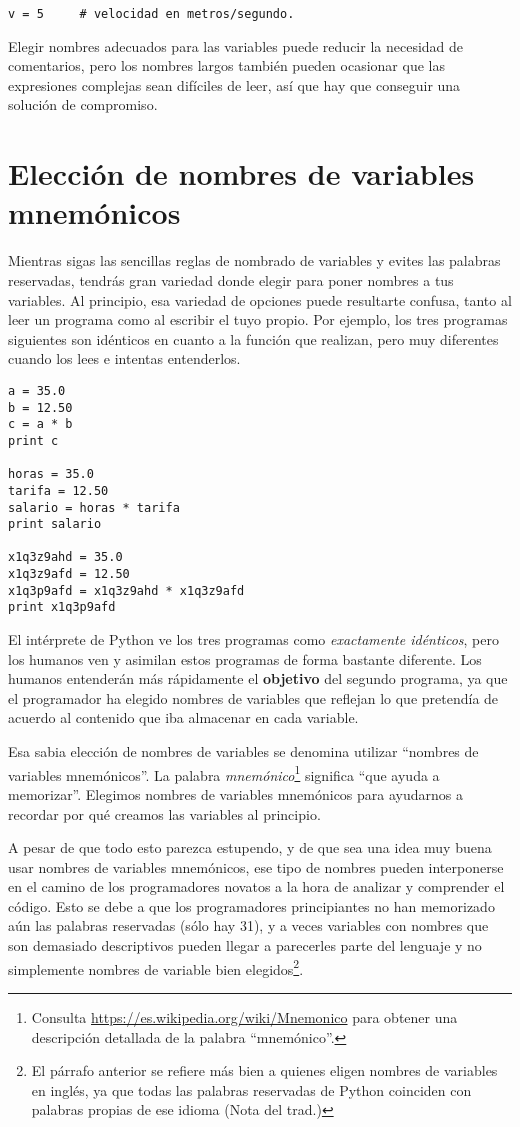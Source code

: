 \beforeverb
\begin{verbatim}
v = 5     # velocidad en metros/segundo. 
\end{verbatim}
\afterverb
%
Elegir nombres adecuados para las variables puede reducir la necesidad de comentarios, pero
los nombres largos también pueden ocasionar que las expresiones complejas sean difíciles de leer, así
que hay que conseguir una solución de compromiso.

\section{Elección de nombres de variables mnemónicos}


Mientras sigas las sencillas reglas de nombrado de variables y evites las
palabras reservadas, tendrás gran variedad donde elegir para poner nombres a tus variables.
Al principio, esa variedad de opciones puede resultarte confusa, tanto al leer un programa
como al escribir el tuyo propio. Por ejemplo, los tres
programas siguientes son idénticos en cuanto a la función que realizan,
pero muy diferentes cuando los lees e intentas entenderlos.

\beforeverb
\begin{verbatim}
a = 35.0
b = 12.50
c = a * b
print c

horas = 35.0
tarifa = 12.50
salario = horas * tarifa
print salario

x1q3z9ahd = 35.0
x1q3z9afd = 12.50
x1q3p9afd = x1q3z9ahd * x1q3z9afd
print x1q3p9afd
\end{verbatim}
\afterverb
%
El intérprete de Python ve los tres programas como \emph{exactamente idénticos},
pero los humanos ven y asimilan estos programas de forma bastante diferente.
Los humanos entenderán más rápidamente el {\bf objetivo}
del segundo programa, ya que el programador
ha elegido nombres de variables que reflejan lo que pretendía
de acuerdo al contenido que iba almacenar en cada variable.

Esa sabia elección de nombres de variables se denomina utilizar ``nombres de variables mnemónicos''.
La palabra \emph{mnemónico}\footnote{Consulta
\url{https://es.wikipedia.org/wiki/Mnemonico}
para obtener una descripción detallada de la palabra ``mnemónico''.}
significa ``que ayuda a memorizar''.
Elegimos nombres de variables mnemónicos para ayudarnos a recordar por qué creamos las variables
al principio.

A pesar de que todo esto parezca estupendo, y de que sea una idea muy buena usar nombres
de variables mnemónicos, ese tipo de nombres pueden interponerse en el camino de los programadores
novatos a la hora de analizar y comprender el código. Esto se debe a que los programadores
principiantes no han memorizado aún las palabras reservadas (sólo hay 31), y a veces
variables con nombres que son demasiado descriptivos pueden llegar a parecerles
parte del lenguaje y no simplemente nombres de variable bien elegidos\footnote{El párrafo anterior
se refiere más bien a quienes eligen nombres de variables en inglés, ya que todas las
palabras reservadas de Python coinciden con palabras propias de ese idioma (Nota del trad.)}.

